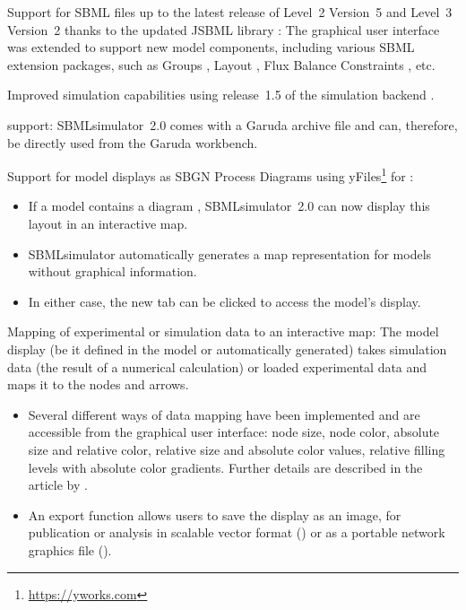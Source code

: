 \begin{dinglist}{52}
\item Support for SBML files up to the latest release of Level~2 Version~5 \citep{Hucka2015} and Level~3 Version~2 \citep{Hucka2019} thanks to the updated JSBML library \citep{Draeger2011, Rodriguez2015}: The graphical user interface was extended to support new model components, including various SBML extension packages, such as Groups \citep{Hucka2016groups}, Layout \citep[][see further description below]{Gauges2015}, Flux Balance Constraints \citep{Olivier2015}, etc.
\item Improved simulation capabilities using release~1.5 of the simulation backend \SBSCL \citep{Keller2013}.
\item \Garuda \citep{Ghosh2011} support: SBMLsimulator~2.0 comes with a Garuda archive file and can, therefore, be directly used from the Garuda workbench.
\item Support for model displays as SBGN Process Diagrams \citep{Rougny2019} using yFiles\footnote{\url{https://yworks.com}} for \Java:
  \begin{itemize}
  \item If a model contains a diagram \citep[in the format of the SBML Layout Extension][]{Gauges2015}, SBMLsimulator~2.0 can now display this layout in an interactive map.
  \item SBMLsimulator automatically generates a map representation for models without graphical information.
  \item In either case, the new tab  can be clicked to access the model's display.
  \end{itemize}
\item Mapping of experimental or simulation data to an interactive map: The model display (be it defined in the model or automatically generated) takes simulation data (the result of a numerical calculation) or loaded experimental data and maps it to the nodes and arrows.
  \begin{itemize}
  \item Several different ways of data mapping have been implemented and are accessible from the graphical user interface: node size, node color, absolute size and relative color, relative size and absolute color values, relative filling levels with absolute color gradients. Further details are described in the article by \citet{Buchweitz2018}.
  \item An export function allows users to save the display as an image, \eg for publication or analysis in scalable vector format (\SVG) or as a portable network graphics file (\PNG).

\end{itemize}
\end{dinglist}
